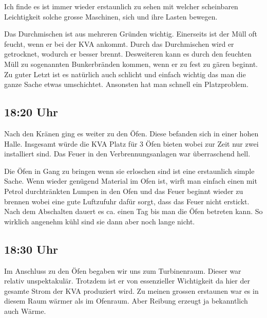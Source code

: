 Ich finde es ist immer wieder erstaunlich zu sehen mit welcher
scheinbaren Leichtigkeit solche grosse Maschinen, sich und ihre Lasten
bewegen.  

Das Durchmischen ist aus mehreren Gründen wichtig. Einerseits ist der
Müll oft feucht, wenn er bei der KVA ankommt. Durch das Durchmischen
wird er getrocknet, wodurch er besser brennt. Desweiteren kann es durch
den feuchten Müll zu sogenannten Bunkerbränden kommen, wenn er zu fest
zu gären beginnt. Zu guter Letzt ist es natürlich auch schlicht und
einfach wichtig das man die ganze Sache etwas umschichtet. Ansonsten
hat man schnell ein Platzproblem.

\subsection{18:20 Uhr}
\label{sec-2-7}
Nach den Kränen ging es weiter zu den Öfen. Diese befanden sich in
einer hohen Halle. Insgesamt würde die KVA Platz für 3 Öfen bieten
wobei zur Zeit nur zwei installiert sind. Das Feuer in den
Verbrennungsanlagen war überraschend hell.

\begin{center}
\end{center}

Die Öfen in Gang zu bringen wenn sie erloschen sind ist eine
erstaunlich simple Sache. Wenn wieder genügend Material im Ofen ist,
wirft man einfach einen mit Petrol durchtränkten Lumpen in den Ofen
und das Feuer beginnt wieder zu brennen wobei eine gute Luftzufuhr
dafür sorgt, dass das Feuer nicht erstickt. Nach dem Abschalten dauert
es ca. einen Tag bis man die Öfen betreten kann. So wirklich angenehm
kühl sind sie dann aber noch lange nicht.

\subsection{18:30 Uhr}
\label{sec-2-8}
Im Anschluss zu den Öfen begaben wir uns zum Turbinenraum. Dieser war
relativ unspektakulär. Trotzdem ist er von essenzieller Wichtigkeit da
hier der gesamte Strom der KVA produziert wird. Zu meinen grossen
erstaunen war es in diesem Raum wärmer als im Ofenraum. Aber Reibung
erzeugt ja bekanntlich auch Wärme.

